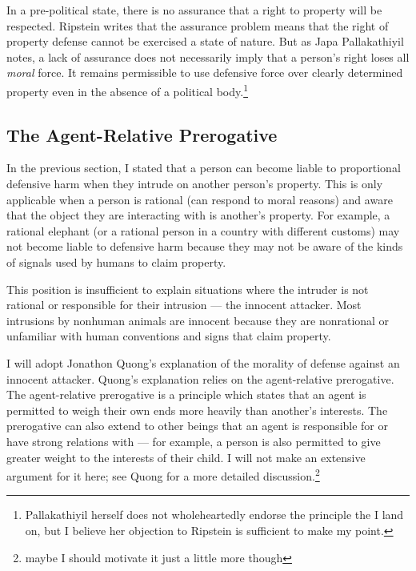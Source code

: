 	In a pre-political state, there is no assurance that a right to property
	will be respected. Ripstein writes that the assurance problem means that
	the right of property defense cannot be exercised a state of
	nature.\autocite[162]{ripstein_force_freedom} But as Japa Pallakathiyil
	notes, a lack of assurance does not necessarily imply that a person’s right
	loses all \emph{moral} force. It remains permissible to use defensive force
	over clearly determined property even in the absence of a political
	body.\footnote{Pallakathiyil herself does not wholeheartedly endorse the
	principle the I land on, but I believe her objection to Ripstein is
sufficient to make my point.}

	\subsection{The Agent-Relative Prerogative}

	In the previous section, I stated that a person can become liable to
	proportional defensive harm when they intrude on another person’s property.
	This is only applicable when a person is rational (can respond to moral
	reasons) and aware that the object they are interacting with is another’s
	property. For example, a rational elephant (or a rational person in a
	country with different customs) may not become liable to defensive harm
	because they may not be aware of the kinds of signals used by humans to
	claim property.

	This position is insufficient to explain situations where the intruder is
	not rational or responsible for their intrusion --- the innocent attacker.
	Most intrusions by nonhuman animals are innocent because they are
	nonrational or unfamiliar with human conventions and signs that claim
	property.

	I will adopt Jonathon Quong’s explanation of the morality of defense against
	an innocent attacker. Quong’s explanation relies on the agent-relative
	prerogative. The agent-relative prerogative is a principle which states that
	an agent is permitted to weigh their own ends more heavily than another’s
	interests. The prerogative can also extend to other beings that an agent is
	responsible for or have strong relations with --- for example, a person is
	also permitted to give greater weight to the interests of their child. I
	will not make an extensive argument for it here; see Quong for a more
	detailed discussion.\footnote{maybe I should motivate it just a little more
	though}

